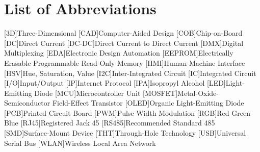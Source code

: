 {}

\section*{List of Abbreviations}
\begin{acronym}[1234567890]\itemsep1pt
	[3D]{Three-Dimensional}
	[CAD]{Computer-Aided Design}
	[COB]{Chip-on-Board}
	[DC]{Direct Current}
	[DC-DC]{Direct Current to Direct Current}
	[DMX]{Digital Multiplexing}
	[EDA]{Electronic Design Automation}
	[EEPROM]{Electrically Erasable Programmable Read-Only Memory}
	[HMI]{Human-Machine Interface}
	[HSV]{Hue, Saturation, Value}
	[I2C]{Inter-Integrated Circuit}
	[IC]{Integrated Circuit}
	[I/O]{Input/Output}
	[IP]{Internet Protocol}
	[IPA]{Isopropyl Alcohol}
	[LED]{Light-Emitting Diode}
	[MCU]{Microcontroller Unit}
	[MOSFET]{Metal-Oxide-Semiconductor Field-Effect Transistor}
	[OLED]{Organic Light-Emitting Diode}
	[PCB]{Printed Circuit Board}
	[PWM]{Pulse Width Modulation}
	[RGB]{Red Green Blue}
	[RJ45]{Registered Jack 45}
	[RS485]{Recommended Standard 485}
	[SMD]{Surface-Mount Device}
	[THT]{Through-Hole Technology}
	[USB]{Universal Serial Bus}
	[WLAN]{Wireless Local Area Network}
\end{acronym}

